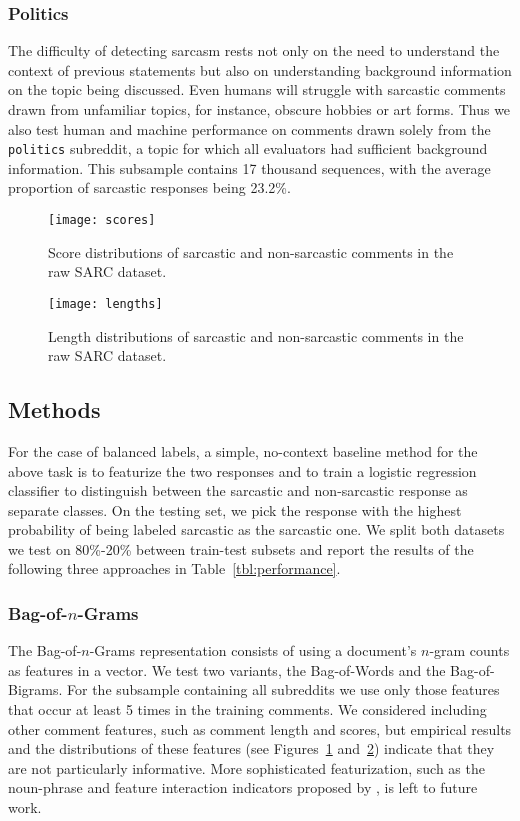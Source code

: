 \documentclass[10pt, a4paper]{article}
\begin{document}
\subsubsection{Politics}
The difficulty of detecting sarcasm rests not only on the need to understand the context of previous statements but also on understanding background information on the topic being discussed.
Even humans will struggle with sarcastic comments drawn from unfamiliar topics, for instance, obscure hobbies or art forms.
Thus we also test human and machine performance on comments drawn solely from the \texttt{politics} subreddit, a topic for which all evaluators had sufficient background information.
This subsample contains 17 thousand sequences, with the average proportion of sarcastic responses being 23.2\%.

\begin{figure}
	\centering
	\texttt{[image: scores]}
	\caption{\label{fig:scores} Score distributions of sarcastic and non-sarcastic comments in the raw SARC dataset.}
\end{figure}

\begin{figure}
	\centering
	\texttt{[image: lengths]}
	\caption{\label{fig:lengths} Length distributions of sarcastic and non-sarcastic comments in the raw SARC dataset.}
\end{figure}

\subsection{Methods}
\label{subsec:methods}
For the case of balanced labels, a simple, no-context baseline method for the above task is to featurize the two responses and to train a logistic regression classifier to distinguish between the sarcastic and non-sarcastic response as separate classes.
On the testing set, we pick the response with the highest probability of being labeled sarcastic as the sarcastic one.
We split both datasets we test on 80\%-20\% between train-test subsets and report the results of the following three approaches in Table~\ref{tbl:performance}.

\subsubsection{Bag-of-$n$-Grams}
\label{subsec:bong}

The Bag-of-$n$-Grams representation consists of using a document's $n$-gram counts as features in a vector.
We test two variants, the Bag-of-Words and the Bag-of-Bigrams.
For the subsample containing all subreddits we use only those features that occur at least 5 times in the training comments.
We considered including other comment features, such as comment length and scores, but empirical results and the distributions of these features (see Figures~\ref{fig:scores} and~\ref{fig:lengths}) indicate that they are not particularly informative.
More sophisticated featurization, such as the noun-phrase and feature interaction indicators proposed by \cite{Wallace:14}, is left to future work.
\end{document}

